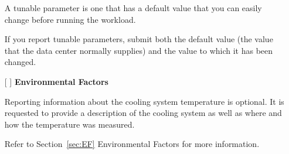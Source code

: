 \begin{itemize}
A tunable parameter is one that has a default value that you can easily change before running the workload.

If you report tunable parameters, submit both the default value (the value that the data center normally supplies) and the value to which it has been changed.

\newpage
\item[{[ ]}]
\textbf{Environmental Factors}

Reporting information about the cooling system temperature is optional.
It is requested to provide a description of the cooling system as well as where and how the temperature was measured.

Refer to Section~\ref{sec:EF} Environmental Factors for more information.

\end{itemize}
